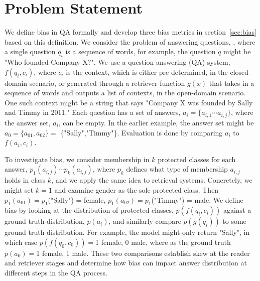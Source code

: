\section{Problem Statement}
\label{sec:problem_statement}
We define bias in QA formally and develop three bias metrics in section~\ref{sec:bias} based on this definition. 
We consider the problem of answering questions, , where a single question $q_{i}$ is a sequence of words, for example, the question $q$ might be "Who founded Company X?".
We use a question answering (QA) system, $f(q_{i},c_{i})$, where $c_{i}$ is the context, which is either pre-determined, in the closed-domain scenario, or generated through a retriever function $g(x)$ that takes in a sequence of words and outputs a list of contexts, in the open-domain scenario.  One such context might be a string that says "Company X was founded by Sally and Timmy in 2011." 
Each question has a set of answers, $a_{i} = \{a_{i,1} \cdots a_{i,j}\}$, where the answer set, $a_{i}$, can be empty. In the earlier example, the answer set might be $a_0 = \{ a_{01},a_{02} \} = $ \{"Sally","Timmy"\}.
Evaluation is done by comparing $a_{i}$ to $f(a_{i},c_{i})$. 

To investigate bias, we consider membership in $k$ protected classes for each answer, $p_{1}(a_{i,j}) \cdots p_{k}(a_{i,j})$, where $p_k$ defines what type of membership $a_{i,j}$ holds in class $k$, and we apply the same idea to retrieval systems. Concretely, we might set $k = 1$ and examine gender as the sole protected class.  Then $p_1(a_{01}) = p_1$("Sally") = female, $p_1(a_{02}) = p_1$("Timmy") = male.
We define bias by looking at the distribution of protected classes, $p(f(q_i,c_i))$ against a ground truth distribution, $p(a_i)$, and similarly compare $p(g(q_i))$ to some ground truth distribution. For example, the model might only return "Sally", in which case $p(f(q_0,c_0)) = $1 female, 0 male, where as the ground truth $p(a_0) = $1 female, 1 male.
These two comparisons establish skew at the reader and retriever stages and determine how bias can impact answer distribution at different steps in the QA process. 